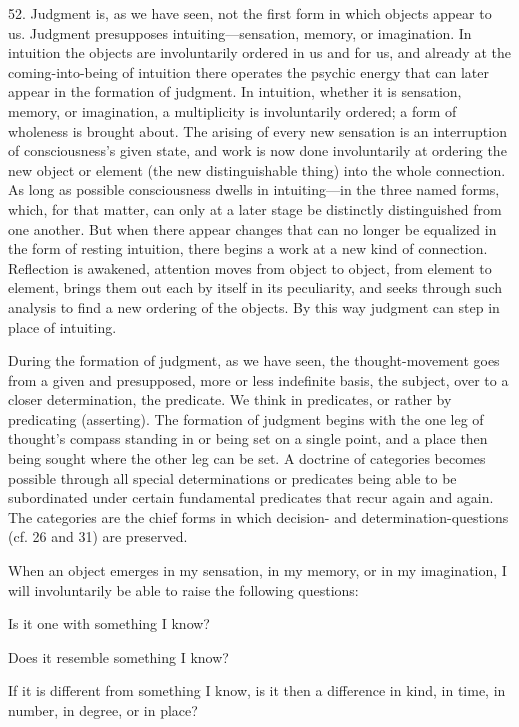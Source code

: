 \documentclass[12pt,a4paper]{book}
\newcommand{\opage}[1]{\marginnote{\footnotesize\textit{[#1]}}}
\begin{document}
52. Judgment is, as we have seen, not the first form in which objects
appear to us. Judgment presupposes intuiting---sensation, memory, or
imagination. In intuition the objects are involuntarily ordered in us and
for us, and already at \opage{137}the coming-into-being of intuition there operates the
psychic energy that can later appear in the formation of judgment. In
intuition, whether it is sensation, memory, or imagination, a multiplicity
is involuntarily ordered; a form of wholeness is brought about. The arising
of every new sensation is an interruption of consciousness's given state,
and work is now done involuntarily at ordering the new object or element
(the new distinguishable thing) into the whole connection. As long as
possible consciousness dwells in intuiting---in the three named forms,
which, for that matter, can only at a later stage be distinctly
distinguished from one another. But when there appear changes that can no
longer be equalized in the form of resting intuition, there begins a work
at a new kind of connection. Reflection is awakened, attention moves from
object to object, from element to element, brings them out each by itself
in its peculiarity, and seeks through such analysis to find a new ordering
of the objects. By this way judgment can step in place of intuiting.

During the formation of judgment, as we have seen, the thought-movement
goes from a given and presupposed, more or less indefinite basis, the
subject, over to a closer determination, the predicate. We think in
predicates, or rather by predicating (asserting). The formation of judgment
begins with the one leg of thought's compass standing in or being set on a
single point, and a place then being sought where the other leg can be set.
A doctrine of categories becomes possible through all special
determinations or predicates being able to be subordinated under certain fundamental predicates that recur again and again. The categories are the
chief forms in which decision- and determination-questions (cf. 26 and 31)
are preserved.

When an object emerges in my sensation, in my memory, or in my imagination,
I will involuntarily be able to raise the following questions:

Is it one with something I know?

Does it resemble something I know?

If it is different from something I know, is it then a difference in kind,
in time, in number, in degree, or in place?
\end{document}
